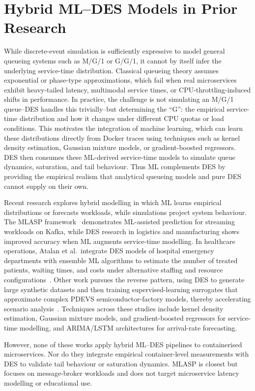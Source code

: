 \section{Hybrid ML--DES Models in Prior Research}

While discrete-event simulation is sufficiently expressive to model general queueing systems such as M/G/1 or G/G/1, it cannot by itself infer the underlying service-time distribution. Classical queueing theory assumes exponential or phase-type approximations, which fail when real microservices exhibit heavy-tailed latency, multimodal service times, or CPU-throttling-induced shifts in performance. In practice, the challenge is not simulating an M/G/1 queue--DES handles this trivially--but determining the ``G'': the empirical service-time distribution and how it changes under different CPU quotas or load conditions. This motivates the integration of machine learning, which can learn these distributions directly from Docker traces using techniques such as kernel density estimation, Gaussian mixture models, or gradient-boosted regressors. DES then consumes these ML-derived service-time models to simulate queue dynamics, saturation, and tail behaviour. Thus ML complements DES by providing the empirical realism that analytical queueing models and pure DES cannot supply on their own.

Recent research explores hybrid modelling in which ML learns empirical distributions or forecasts workloads, while simulations project system behaviour. The MLASP framework~\cite{VituiChen2021} demonstrates ML-assisted prediction for streaming workloads on Kafka, while DES research in logistics and manufacturing shows improved accuracy when ML augments service-time modelling. In healthcare operations, Atalan et al.\ integrate DES models of hospital emergency departments with ensemble ML algorithms to estimate the number of treated patients, waiting times, and costs under alternative staffing and resource configurations~\cite{Atalan2022HealthcareMLDES}. Other work pursues the reverse pattern, using DES to generate large synthetic datasets and then training supervised-learning surrogates that approximate complex PDEVS semiconductor-factory models, thereby accelerating scenario analysis~\cite{Sarjoughian2023TransformDES}. Techniques across these studies include kernel density estimation, Gaussian mixture models, and gradient-boosted regressors for service-time modelling, and ARIMA/LSTM architectures for arrival-rate forecasting.

However, none of these works apply hybrid ML--DES pipelines to containerised microservices. Nor do they integrate empirical container-level measurements with DES to validate tail behaviour or saturation dynamics. MLASP is closest but focuses on message-broker workloads and does not target microservice latency modelling or educational use.

